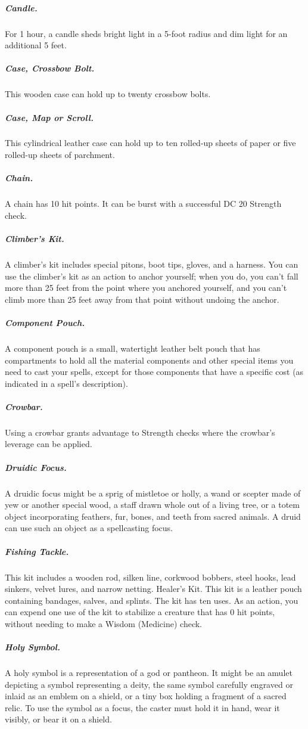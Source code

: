 \subparagraph*{Candle.} For 1 hour, a candle sheds bright light in a 5-foot radius and dim light for an additional 5 feet.

\subparagraph*{Case, Crossbow Bolt.} This wooden case can hold up to twenty crossbow bolts.

\subparagraph*{Case, Map or Scroll.} This cylindrical leather case can hold up to ten rolled-up sheets of paper or five rolled-up sheets of parchment.

\subparagraph*{Chain.} A chain has 10 hit points. It can be burst with a successful DC 20 Strength check.

\subparagraph*{Climber's Kit.} A climber's kit includes special pitons, boot tips, gloves, and a harness. You can use the climber's kit as an action to anchor yourself; when you do, you can't fall more than 25 feet from the point where you anchored yourself, and you can't climb more than 25 feet away from that point without undoing the anchor.

\subparagraph*{Component Pouch.} A component pouch is a small, watertight leather belt pouch that has compartments to hold all the material components and other special items you need to cast your spells, except for those components that have a specific cost (as indicated in a spell's description).
\subparagraph*{Crowbar.} Using a crowbar grants advantage to Strength checks where the crowbar's leverage can be applied.

\subparagraph*{Druidic Focus.} A druidic focus might be a sprig of mistletoe or holly, a wand or scepter made of yew or another special wood, a staff drawn whole out of a living tree, or a totem object incorporating feathers, fur, bones, and teeth from sacred animals. A druid can use such an object as a spellcasting focus.

\subparagraph*{Fishing Tackle.} This kit includes a wooden rod, silken line, corkwood bobbers, steel hooks, lead sinkers, velvet lures, and narrow netting.
Healer's Kit. This kit is a leather pouch containing bandages, salves, and splints. The kit has ten uses. As an action, you can expend one use of the kit to stabilize a creature that has 0 hit points, without needing to make a Wisdom (Medicine) check.

\subparagraph*{Holy Symbol.} A holy symbol is a representation of a god or pantheon. It might be an amulet depicting a symbol representing a deity, the same symbol carefully engraved or inlaid as an emblem on a shield, or a tiny box holding a fragment of a sacred relic. To use the symbol as a focus, the caster must hold it in hand, wear it visibly, or bear it on a shield.

